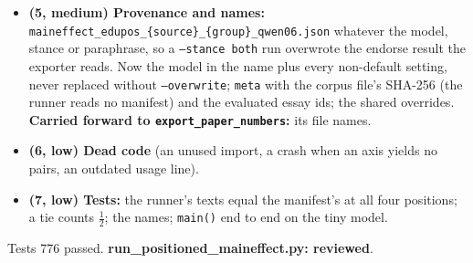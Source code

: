 \documentclass{article}
\begin{document}
\begin{itemize}
  \item \textbf{(5, medium) Provenance and names:} \texttt{maineffect\_edupos\_\{source\}\_\{group\}\_qwen06.json}
        whatever the model, stance or paraphrase, so a \texttt{--stance both} run overwrote the endorse result the
        exporter reads. Now the model in the name plus every non-default setting, never replaced without
        \texttt{--overwrite}; \texttt{meta} with the corpus file's SHA-256 (the runner reads no manifest) and the
        evaluated essay ids; the shared overrides. \textbf{Carried forward to \texttt{export\_paper\_numbers}:} its
        file names.
  \item \textbf{(6, low) Dead code} (an unused import, a crash when an axis yields no pairs, an outdated usage line).
  \item \textbf{(7, low) Tests:} the runner's texts equal the manifest's at all four positions; a tie counts
        $\tfrac12$; the names; \texttt{main()} end to end on the tiny model.
\end{itemize}
Tests 776 passed. \textbf{run\_positioned\_maineffect.py: reviewed}.
\end{document}
